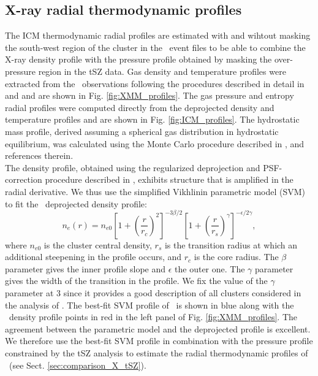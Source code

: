 \documentclass[traditabstract]{aa}
\begin{document}
\subsection{X-ray radial thermodynamic profiles}\label{sec:X_ray_profiles}
The ICM thermodynamic radial profiles are estimated with and wihtout masking the south-west region of the cluster in the \xmm\ event files to be able to combine the X-ray density profile with the pressure profile obtained by masking the over-pressure region in the tSZ data. Gas density and temperature profiles were extracted from the \xmm\ observations following the procedures described in detail in \cite{pra10} and \cite{plaint13} and are shown in Fig. \ref{fig:XMM_profiles}. The gas pressure and entropy radial profiles were computed directly from the deprojected density and temperature profiles and are shown in Fig. \ref{fig:ICM_profiles}. The hydrostatic mass profile, derived assuming a spherical gas distribution in hydrostatic equilibrium, was calculated using the Monte Carlo procedure described in \cite{dem10}, and references therein.\\
\indent The density profile, obtained using the regularized deprojection and PSF-correction procedure described in \cite{cro06}, exhibits structure that is amplified in the radial derivative. We thus use the simplified Vikhlinin parametric model (SVM) \citep{vik06} to fit the \xmm\ deprojected density profile:
\begin{equation}
        n_e(r) = n_{e0} \left[1+\left(\frac{r}{r_c}\right)^2 \right]^{-3 \beta /2} \left[ 1+\left(\frac{r}{r_s}\right)^{\gamma} \right]^{-\epsilon/2 \gamma},
\label{eq:SVM}
\end{equation}
where $n_{e0}$ is the cluster central density, $r_s$ is the transition radius at which an additional steepening in the profile occurs, and $r_c$ is the core radius. The $\beta$ parameter gives the inner profile slope and $\epsilon$ the outer one. The $\gamma$ parameter gives the width of the transition in the profile. We fix the value of the $\gamma$ parameter at 3 since it provides a good description of all clusters considered in the analysis of \cite{vik06b}. The best-fit SVM profile of \psz\ is shown in blue along with the \xmm\ density profile points in red in the left panel of Fig. \ref{fig:XMM_profiles}. The agreement between the parametric model and the deprojected profile is excellent. We therefore use the best-fit SVM profile in combination with the pressure profile constrained by the tSZ analysis to estimate the radial thermodynamic profiles of \psz\ (see Sect. \ref{sec:comparison_X_tSZ}).
\end{document}
